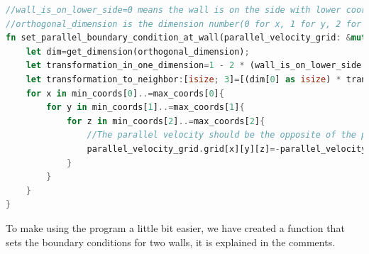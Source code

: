 \documentclass{article}
\begin{document}
\begin{lstlisting}[language=Rust, style=boxed, breaklines=true]
//wall_is_on_lower_side=0 means the wall is on the side with lower coordinates seen from the dry side and wall_is_on_lower_side=1 means the wall is on the side with higher coordinates. 
//orthogonal_dimension is the dimension number(0 for x, 1 for y, 2 for z) of the dimension orthogonal to the wall
fn set_parallel_boundary_condition_at_wall(parallel_velocity_grid: &mut VelocityGrid, min_coords: [usize; 3], max_coords: [usize; 3], wall_is_on_lower_side: bool, orthogonal_dimension: usize){
    let dim=get_dimension(orthogonal_dimension);
    let transformation_in_one_dimension=1 - 2 * (wall_is_on_lower_side as isize);// -1 when a lower element is needed, +1 when a higher element is needed
    let transformation_to_neighbor:[isize; 3]=[(dim[0] as isize) * transformation_in_one_dimension, (dim[1] as isize) * transformation_in_one_dimension, (dim[2] as isize) * transformation_in_one_dimension];// This is the transformation to the neighbor opposite of the wall
    for x in min_coords[0]..=max_coords[0]{
        for y in min_coords[1]..=max_coords[1]{
            for z in min_coords[2]..=max_coords[2]{
                //The parallel velocity should be the opposite of the parallel velocity on the other side of the wall, so that the average is zero.
                parallel_velocity_grid.grid[x][y][z]=-parallel_velocity_grid.grid[(x as isize + transformation_to_neighbor[0])as usize][(y as isize + transformation_to_neighbor[1]) as usize][(z as isize+transformation_to_neighbor[2]) as usize];          
            }
        }
    }
}
\end{lstlisting}
To make using the program a little bit easier, we have created a function that sets the boundary conditions for two walls, it is explained in the comments.
\end{document}
